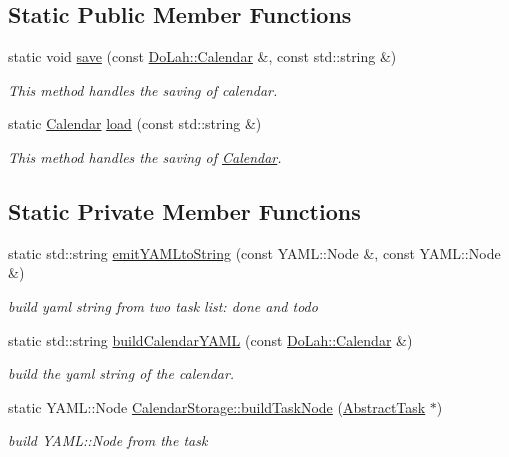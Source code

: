 \subsection*{Static Public Member Functions}
\begin{DoxyCompactItemize}
\item 
static void \hyperlink{class_do_lah_1_1_calendar_storage_a42bf58169068f4cd3a0c5285a3bd07de}{save} (const \hyperlink{class_do_lah_1_1_calendar}{Do\+Lah\+::\+Calendar} \&, const std\+::string \&)
\begin{DoxyCompactList}\small\item\em This method handles the saving of calendar. \end{DoxyCompactList}\item 
static \hyperlink{class_do_lah_1_1_calendar}{Calendar} \hyperlink{class_do_lah_1_1_calendar_storage_a35f14ee71c332fe9bb26a887ceb3f317}{load} (const std\+::string \&)
\begin{DoxyCompactList}\small\item\em This method handles the saving of \hyperlink{class_do_lah_1_1_calendar}{Calendar}. \end{DoxyCompactList}\end{DoxyCompactItemize}
\subsection*{Static Private Member Functions}
\begin{DoxyCompactItemize}
\item 
static std\+::string \hyperlink{class_do_lah_1_1_calendar_storage_a3cb4b54df533884fa7506d803f19e002}{emit\+Y\+A\+M\+Lto\+String} (const Y\+A\+M\+L\+::\+Node \&, const Y\+A\+M\+L\+::\+Node \&)
\begin{DoxyCompactList}\small\item\em build yaml string from two task list\+: done and todo \end{DoxyCompactList}\item 
static std\+::string \hyperlink{class_do_lah_1_1_calendar_storage_adb9b1537e8bc0314e6cc6b76daf62ba3}{build\+Calendar\+Y\+A\+M\+L} (const \hyperlink{class_do_lah_1_1_calendar}{Do\+Lah\+::\+Calendar} \&)
\begin{DoxyCompactList}\small\item\em build the yaml string of the calendar. \end{DoxyCompactList}\item 
static Y\+A\+M\+L\+::\+Node \hyperlink{class_do_lah_1_1_calendar_storage_a1c4f50ec5ae99c28cc7cb924d21151df}{Calendar\+Storage\+::build\+Task\+Node} (\hyperlink{class_do_lah_1_1_abstract_task}{Abstract\+Task} $\ast$)
\begin{DoxyCompactList}\small\item\em build Y\+A\+M\+L\+::\+Node from the task \end{DoxyCompactList}\end{DoxyCompactItemize}


